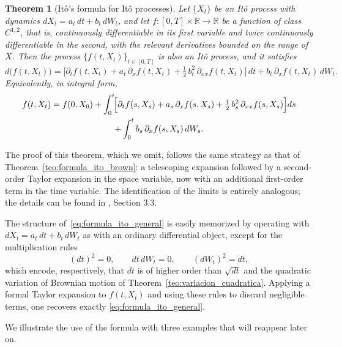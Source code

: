 \documentclass[11pt,a4paper,oneside]{report}
\theoremstyle{plain}
\newtheorem{teorema}{Theorem}[chapter]
\theoremstyle{definition}
\theoremstyle{remark}
\newcommand{\R}{\mathbb{R}}
\newcommand{\1}{\mathbf{1}}
\begin{document}
\begin{teorema}[Itô's formula for Itô processes]
\label{teo:formula_ito_general}
Let $\{X_t\}$ be an Itô process with dynamics
$dX_t = a_t\, dt + b_t\, dW_t$, and let $f : [0, T] \times \R \to \R$
be a function of class $C^{1,2}$, that is, continuously
differentiable in its first variable and twice continuously
differentiable in the second, with the relevant derivatives bounded
on the range of $X$. Then the process $\{f(t, X_t)\}_{t \in [0, T]}$
is also an Itô process, and it satisfies
\begin{equation}\label{eq:formula_ito_general}
  d\bigl(f(t, X_t)\bigr)
  = \biggl[\partial_t f(t, X_t) + a_t\, \partial_x f(t, X_t)
           + \tfrac{1}{2}\, b_t^2\, \partial_{xx} f(t, X_t)\biggr]\, dt
   + b_t\, \partial_x f(t, X_t)\, dW_t.
\end{equation}
Equivalently, in integral form,
\begin{multline*}
  f(t, X_t) = f(0, X_0)
      + \int_0^t \!\Bigl[\partial_t f(s, X_s) + a_s\, \partial_x f(s, X_s)
                          + \tfrac{1}{2}\, b_s^2\, \partial_{xx} f(s, X_s)\Bigr]
                          ds \\
      + \int_0^t b_s\, \partial_x f(s, X_s)\, dW_s.
\end{multline*}
\end{teorema}

The proof of this theorem, which we omit, follows the same strategy
as that of Theorem~\ref{teo:formula_ito_brown}: a telescoping
expansion followed by a second-order Taylor expansion in the space
variable, now with an additional first-order term in the time
variable. The identification of the limits is entirely analogous; the
details can be found in \cite{karatzas-shreve}, Section 3.3.

The structure
of~\eqref{eq:formula_ito_general} is easily memorized by operating
with $dX_t = a_t\, dt + b_t\, dW_t$ as with an ordinary differential
object, except for the multiplication rules
\begin{equation}\label{eq:reglas_ito}
  (dt)^2 = 0, \qquad dt\, dW_t = 0, \qquad (dW_t)^2 = dt,
\end{equation}
which encode, respectively, that $dt$ is of higher order than
$\sqrt{dt}$ and the quadratic variation of Brownian motion of
Theorem~\ref{teo:variacion_cuadratica}. Applying a formal Taylor
expansion to $f(t, X_t)$ and using these rules to discard negligible
terms, one recovers exactly \eqref{eq:formula_ito_general}.

We illustrate the use of the
formula with three examples that will reappear later on.
\end{document}
